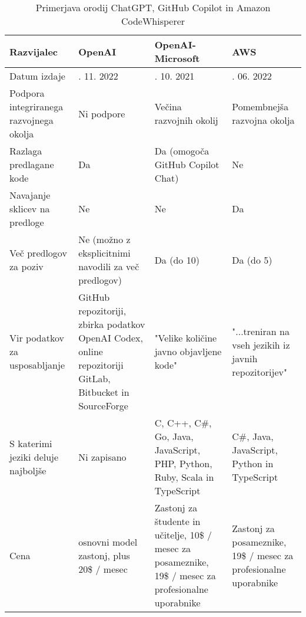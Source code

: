\documentclass[a4paper,12pt,openright]{book}
\begin{document}
\begin{longtable}{|>{\raggedright\arraybackslash}p{2.5cm}|>{\raggedright\arraybackslash}p{3cm}|>{\raggedright\arraybackslash}p{3.5cm}|>{\raggedright\arraybackslash}p{3cm}|}
\caption{Primerjava orodij ChatGPT, GitHub Copilot in Amazon CodeWhisperer} \\
\hline
Razvijalec              & OpenAI      & OpenAI-Microsoft                  & AWS            \\ \hline
Datum izdaje               & 30. 11. 2022        & 29. 10. 2021           & 23. 06. 2022       \\ \hline
Podpora integriranega razvojnega okolja           & Ni podpore          & Večina razvojnih okolij        & Pomembnejša razvojna okolja          \\ \hline
Razlaga predlagane kode       & Da                       & Da (omogoča GitHub Copilot Chat)                           & Ne                       \\ \hline
Navajanje sklicev na predloge                  & Ne                      & Ne                    & Da                      \\ \hline
Več predlogov za poziv                & Ne (možno z eksplicitnimi navodili za več predlogov)         & Da (do 10)                  & Da (do 5)               \\ \hline
Vir podatkov za usposabljanje             & GitHub repozitoriji, zbirka podatkov OpenAI Codex, online repozitoriji GitLab, Bitbucket in SourceForge                   & "Velike količine javno objavljene kode"                  & "...treniran na vseh jezikih iz javnih repozitorijev"                    \\ \hline
S katerimi jeziki deluje najboljše                        & Ni zapisano                  & C, C++, C\#, Go, Java, JavaScript, PHP, Python, Ruby, Scala in TypeScript              & C\#, Java, JavaScript, Python in TypeScript  \\ \hline
Cena               & osnovni model zastonj, plus 20\$ / mesec          & Zastonj za študente in učitelje, 10\$ / mesec za posameznike, 19\$ / mesec za profesionalne uporabnike                    &   Zastonj za posameznike, 19\$ / mesec za profesionalne uporabnike            \\ \hline
\end{longtable}
\label{tab:comparison}
\end{document}
